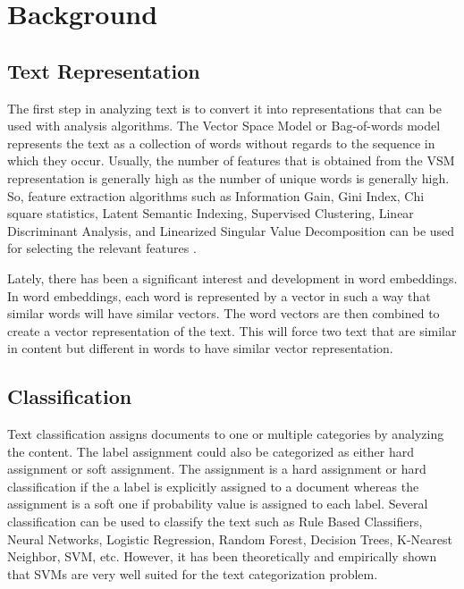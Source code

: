 \chapter{Background} \label{background}

\section{Text Representation}\label{feature}
The first step in analyzing text is to convert it into representations that can be used with analysis algorithms. The Vector Space Model or Bag-of-words model represents the text as a collection of words without regards to the sequence in which they occur. Usually, the number of features that is obtained from the VSM representation is generally high as the number of unique words is generally high. So, feature extraction algorithms such as Information Gain, Gini Index, Chi square statistics, Latent Semantic Indexing, Supervised Clustering, Linear Discriminant Analysis, and Linearized Singular Value Decomposition can be used for selecting the relevant features \cite{aggarwal2012survey}. \par
Lately, there has been a significant interest and development in word embeddings\cite{mikolov2013distributed}\cite{pennington2014glove}\cite{bojanowski2017enriching}. In word embeddings, each word is represented by a vector in such a way that similar words will have similar vectors\cite{goldberg2014word2vec}. The word vectors are then combined to create a vector representation of the text. This will force two text that are similar in content but different in words to have similar vector representation.

\section{Classification}\label{classification}
Text classification assigns documents to one or multiple categories by analyzing the content. The label assignment could also be categorized as either hard assignment or soft assignment. The assignment is a hard assignment or hard classification if the a label is explicitly assigned to a document whereas the assignment is a soft one if probability value is assigned to each label. Several classification can be used to classify the text such as Rule Based Classifiers, Neural Networks, Logistic Regression, Random Forest, Decision Trees, K-Nearest Neighbor, SVM\cite{cortes1995support}, etc. However, it has been theoretically and empirically shown that SVMs are very well suited for the text categorization problem\cite{joachims1998text}.

